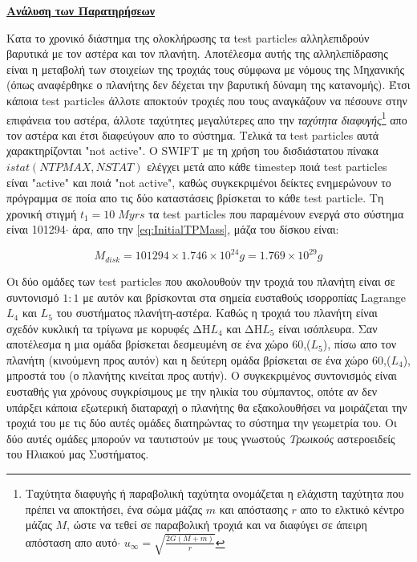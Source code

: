 \underline{\bf Ανάλυση των Παρατηρήσεων}
\vspace{0.3cm}   
   
Κατα το χρονικό διάστημα της ολοκλήρωσης τα {\en test particles} αλληλεπιδρούν βαρυτικά με τον αστέρα και τον πλανήτη. Αποτέλεσμα αυτής της αλληλεπίδρασης είναι η μεταβολή των στοιχείων της τροχιάς τους σύμφωνα με νόμους της Μηχανικής (όπως αναφέρθηκε ο πλανήτης δεν δέχεται την βαρυτική δύναμη της κατανομής). Έτσι κάποια {\en test particles} άλλοτε αποκτούν τροχιές που τους αναγκάζουν να πέσουνε στην επιφάνεια του αστέρα, άλλοτε ταχύτητες μεγαλύτερες απο την {\it ταχύτητα διαφυγής}\footnote{Ταχύτητα διαφυγής ή παραβολική ταχύτητα ονομάζεται η ελάχιστη ταχύτητα που πρέπει να αποκτήσει, ένα σώμα μάζας $m$ και απόστασης $r$ απο το ελκτικό κέντρο μάζας $Μ$, ώστε να τεθεί σε παραβολική τροχιά και να διαφύγει σε άπειρη απόσταση απο αυτό$\cdot$ $u_\infty = \sqrt{\frac{2G(M+m)}{r}}$} απο τον αστέρα και έτσι διαφεύγουν απο το σύστημα. Τελικά τα {\en test particles} αυτά  χαρακτηρίζονται {\en "not active"}. Ο {\en SWIFT} με τη χρήση του δισδιάστατου πίνακα $istat(NTPMAX,NSTAT)$ ελέγχει μετά απο κάθε {\en timestep} ποιά {\en test particles} είναι {\en "active"} και ποιά {\en "not active"}, καθώς συγκεκριμένοι δείκτες ενημερώνουν το πρόγραμμα σε ποία απο τις δύο καταστάσεις βρίσκεται το κάθε {\en test particle}. Τη χρονική στιγμή {\en $t_1=10 \; Myrs$} τα {\en test particles} που παραμένουν ενεργά στο σύστημα είναι 101294$\cdot$ άρα, απο την \eqref{eq:InitialTPMass}, μάζα του δίσκου είναι:

\begin{equation}\label{eq:t_1TPMass}
 M_{disk} =  101294\times1.746\times10^{24}g = 1.769\times10^{29} g
\end{equation} 
 
Οι δύο ομάδες των {\en test particles} που ακολουθούν την τροχιά του πλανήτη είναι σε συντονισμό $1:1$ με αυτόν και βρίσκονται στα {σημεία ευσταθούς ισορροπίας {\en Lagrange}} $L_4$ και $L_5$ του συστήματος πλανήτη-αστέρα\cite[{\en Chap.~3, Sect.~3.5-.3.7}]{murray1999solar}. Καθώς η τροχιά του πλανήτη είναι σχεδόν κυκλική τα τρίγωνα με κορυφές ΔΗ$L_4$ και ΔΗ$L_5$ είναι ισόπλευρα. Σαν αποτέλεσμα η μια ομάδα βρίσκεται δεσμευμένη σε ένα χώρο 60\degree ,($L_5$), πίσω απο τον πλανήτη (κινούμενη προς αυτόν) και η δεύτερη ομάδα βρίσκεται σε ένα χώρο 60\degree ,($L_4$), μπροστά του (ο πλανήτης κινείται προς αυτήν). Ο συγκεκριμένος συντονισμός είναι ευσταθής για χρόνους συγκρίσιμους με την ηλικία του σύμπαντος, οπότε αν δεν υπάρξει κάποια εξωτερική διαταραχή ο πλανήτης θα εξακολουθήσει να μοιράζεται την τροχιά του με τις δύο αυτές ομάδες διατηρώντας το σύστημα την γεωμετρία του. Οι δύο αυτές ομάδες  μπορούν να ταυτιστούν με τους γνωστούς {\it Τρωικούς} αστεροειδείς του Ηλιακού μας Συστήματος.\\
 
